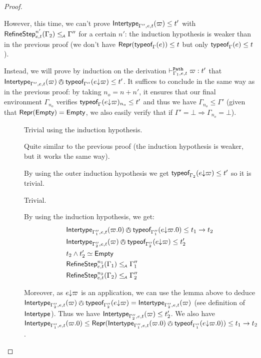 \documentclass[a4paper]{article}
\theoremstyle{definition}
\begin{document}
\begin{proof}
\begin{description}
      However, this time, we can't prove $\textsf{Intertype}_{\Gamma'',e,t} (\varpi) \leq t'$ with $\textsf{RefineStep}_{e,t}^{n'} (\Gamma_2) \leq_{\!\scriptscriptstyle\mathcal{A}} \Gamma''$
      for a certain $n'$: the induction hypothesis is weaker than in the previous proof
      (we don't have $\textsf{Repr}(\textsf{typeof}_{\Gamma}(e)) \leq t$ but only $\textsf{typeof}_{\Gamma}(e) \leq t$).
      
      Instead, we will prove by induction on the derivation $\vdash^{\texttt{Path}}_{\Gamma_1,e,t} \varpi:t'$ that
      $\env {\Gamma'',e,t} (\varpi) \tsand \tyof {\occ e \varpi} {\Gamma''} \leq t'$.
      It suffices to conclude in the same way as in the previous proof:
      by taking $n_o = n+n'$,
      it ensures that our final environment $\Gamma_{n_o}$ verifies $\textsf{typeof}_{\Gamma}(e{\downarrow}\varpi)_{n_o} \leq t'$
      and thus we have $\Gamma_{n_o} \leq \Gamma'$
      (given that $\textsf{Repr}(\textsf{Empty}) = \textsf{Empty}$, we also easily verify that if $\Gamma' = \bot \Rightarrow \Gamma_{n_o}=\bot$).

      \begin{description}
        \item[] Trivial using the induction hypothesis.
        \item[] Quite similar to the previous proof (the induction hypothesis is weaker, but it works the same way).
        \item[] By using the outer induction hypothesis we get $\textsf{typeof}_{\Gamma_2}(e{\downarrow}\varpi) \leq t'$ so it is trivial.
        \item[] Trivial.
        \item[] By using the induction hypothesis, we get:
        \begin{align*}
          &\env {\Gamma_1'',e,t} (\varpi.0) \tsand \tyof {\occ e {\varpi.0}} {\Gamma_1''} \leq \arrow {t_1} {t_2}\\
          &\env {\Gamma_2'',e,t} (\varpi) \tsand \tyof {\occ e {\varpi}} {\Gamma_2''} \leq t_2'\\
          &t_2 \land t_2' \simeq \Empty\\
          &\RefineStep {e,t}^{n_1} (\Gamma_1) \leqA \Gamma_1''\\
          &\RefineStep {e,t}^{n_2} (\Gamma_2) \leqA \Gamma_2''
        \end{align*}

        Moreover, as $e{\downarrow}\varpi$ is an application, we can use the lemma above to deduce
        $\env {\Gamma_2'',e,t} (\varpi) \tsand \tyof {\occ e {\varpi}} {\Gamma_2''} = \env {\Gamma_2'',e,t} (\varpi)$
        (see definition of $\textsf{Intertype}_{}$).
        Thus we have $\textsf{Intertype}_{\Gamma_2'',e,t} (\varpi) \leq t_2'$.
        We also have $\env {\Gamma_1'',e,t} (\varpi.0) \leq \tsrep{\env {\Gamma_1'',e,t} (\varpi.0) \tsand \tyof {\occ e {\varpi.0}} {\Gamma_1''}} \leq \arrow {t_1} {t_2}$.


\end{description}
\end{description}
\end{proof}
\end{document}
